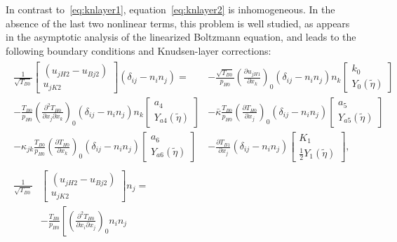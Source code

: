 \documentclass[10pt]{article}
\newcommand{\pder}[2][]{\frac{\partial#1}{\partial#2}}
\newcommand{\pderder}[3][]{\frac{\partial^2#1}{\partial#2\partial#3}}
\newcommand{\deltann}[2]{(\delta_{#1#2}-n_#1 n_#2)}
\newcommand{\onwall}[1]{\left(#1\right)_0}
\begin{document}
In contrast to~\eqref{eq:knlayer1}, equation~\eqref{eq:knlayer2} is inhomogeneous.
In the absence of the last two nonlinear terms, this problem is well studied,
as appears in the asymptotic analysis of the linearized Boltzmann equation,
and leads to the following boundary conditions and Knudsen-layer corrections:
\begin{gather}
    \begin{aligned}
        \frac1{\sqrt{T_{B0}}}
            \begin{bmatrix} (u_{jH2} - u_{Bj2}) \\ u_{jK2} \end{bmatrix}\deltann{i}{j} =
        &- \frac{\sqrt{T_{B0}}}{p_{H0}}\onwall{\pder[u_{jH1}]{x_k}} \deltann{i}{j}n_k
            \begin{bmatrix} k_0 \\ Y_0(\tilde\eta) \end{bmatrix} \\
        - \frac{T_{B0}}{p_{H0}}\onwall{\pderder[T_{H0}]{x_j}{x_k}} \deltann{i}{j}n_k
            \begin{bmatrix} a_4 \\ Y_{a4}(\tilde\eta) \end{bmatrix}
        &- \bar\kappa\frac{T_{B0}}{p_{H0}}\onwall{\pder[T_{H0}]{x_j}} \deltann{i}{j}
            \begin{bmatrix} a_5 \\ Y_{a5}(\tilde\eta) \end{bmatrix} \\
        - \kappa_{jk}\frac{T_{B0}}{p_{H0}}\onwall{\pder[T_{H0}]{x_k}} \deltann{i}{j}
            \begin{bmatrix} a_6 \\ Y_{a6}(\tilde\eta) \end{bmatrix}
        &- \pder[T_{B1}]{x_j} \deltann{i}{j}
            \begin{bmatrix} K_1 \\ \frac12 Y_1(\tilde\eta) \end{bmatrix},
    \end{aligned}\label{eq:boundary_u2t}\\
    \begin{aligned}
        \frac1{\sqrt{T_{B0}}}
            &\begin{bmatrix} (u_{jH2} - u_{Bj2}) \\ u_{jK2} \end{bmatrix} n_j = \\
        &- \frac{T_{B0}}{p_{H0}}\left[ \onwall{\pderder[T_{H0}]{x_i}{x_j}}n_i n_j

\end{aligned}
\end{gather}
\end{document}
